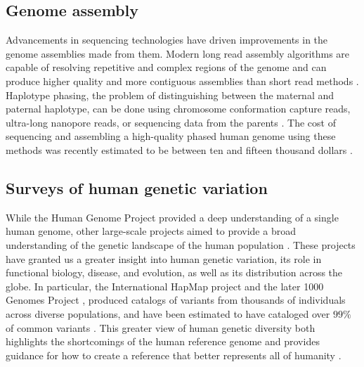 \documentclass[11pt]{ucscthesis}
\begin{document}



\subsection{Genome assembly}

Advancements in sequencing technologies have driven improvements in the genome assemblies made from them.
Modern long read assembly algorithms are capable of resolving repetitive and complex regions of the genome and can produce higher quality and more contiguous assemblies than short read methods \cite{cheng_hifiasm_2021,rautiainen_verkko_2023,shafin_shasta_2020}.
Haplotype phasing, the problem of distinguishing between the maternal and paternal haplotype, can be done using chromosome conformation capture reads, ultra-long nanopore reads, or sequencing data from the parents \cite{cheng_hifiasm_2021}.
The cost of sequencing and assembling a high-quality phased human genome using these methods was recently estimated to be between ten and fifteen thousand dollars \cite{miga_envisioning_2023}.

\subsection{Surveys of human genetic variation}

While the Human Genome Project provided a deep understanding of a single human genome, other large-scale projects aimed to provide a broad understanding of the genetic landscape of the human population \cite{international_hapmap_consortium_international_2003,international2005haplotype,1000_genomes_project_consortium_map_2010,1000gp_2015,chaisson_sv_2019}.
These projects have granted us a greater insight into human genetic variation, its role in functional biology, disease, and evolution, as well as its distribution across the globe.
In particular, the International HapMap project \cite{international_hapmap_consortium_international_2003,international2005haplotype} and the later 1000 Genomes Project \cite{1000_genomes_project_consortium_map_2010,1000gp_2015}, produced catalogs of variants from thousands of individuals across diverse populations, and have been estimated to have cataloged over $99\%$ of common variants \cite{miga_need_pangenome_2021}.
This greater view of human genetic diversity both highlights the shortcomings of the human reference genome and provides guidance for how to create a reference that better represents all of humanity \cite{ballouz_is_2019,miga_need_pangenome_2021}.
\end{document}
